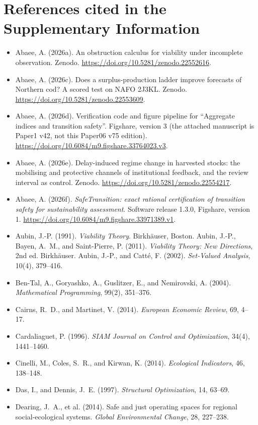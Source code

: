 \documentclass[preprint,11pt,authoryear]{elsarticle}
\theoremstyle{remark}
\begin{document}
\section*{References cited in the Supplementary Information}
\begin{itemize}[leftmargin=1.5em,itemsep=1pt]
\item Abaee, A. (2026a). An obstruction calculus for viability under incomplete observation. Zenodo. \url{https://doi.org/10.5281/zenodo.22552616}.
\item Abaee, A. (2026c). Does a surplus-production ladder improve forecasts of Northern cod? A scored test on NAFO 2J3KL. Zenodo. \url{https://doi.org/10.5281/zenodo.22553609}.
\item Abaee, A. (2026d). Verification code and figure pipeline for ``Aggregate indices and transition safety''. Figshare, version 3 (the attached manuscript is Paper1 v42, not this Paper06 v75 edition). \url{https://doi.org/10.6084/m9.figshare.33764023.v3}.
\item Abaee, A. (2026e). Delay-induced regime change in harvested stocks: the mobilising and protective channels of institutional feedback, and the review interval as control. Zenodo. \url{https://doi.org/10.5281/zenodo.22554217}.
\item Abaee, A. (2026f). \emph{SafeTransition: exact rational certification of transition safety for sustainability assessment}. Software release 1.3.0, Figshare, version 1. \url{https://doi.org/10.6084/m9.figshare.33971389.v1}.
\item Aubin, J.-P. (1991). \emph{Viability Theory}. Birkh\"auser, Boston. Aubin, J.-P., Bayen, A.~M., and Saint-Pierre, P. (2011). \emph{Viability Theory: New Directions}, 2nd ed. Birkh\"auser. Aubin, J.-P., and Catt\'e, F. (2002). \emph{Set-Valued Analysis}, 10(4), 379--416.
\item Ben-Tal, A., Goryashko, A., Guslitzer, E., and Nemirovski, A. (2004). \emph{Mathematical Programming}, 99(2), 351--376.
\item Cairns, R.~D., and Martinet, V. (2014). \emph{European Economic Review}, 69, 4--17.
\item Cardaliaguet, P. (1996). \emph{SIAM Journal on Control and Optimization}, 34(4), 1441--1460.
\item Cinelli, M., Coles, S.~R., and Kirwan, K. (2014). \emph{Ecological Indicators}, 46, 138--148.
\item Das, I., and Dennis, J.~E. (1997). \emph{Structural Optimization}, 14, 63--69.
\item Dearing, J.~A., et al. (2014). Safe and just operating spaces for regional social-ecological systems. \emph{Global Environmental Change}, 28, 227--238.

\end{itemize}
\end{document}
